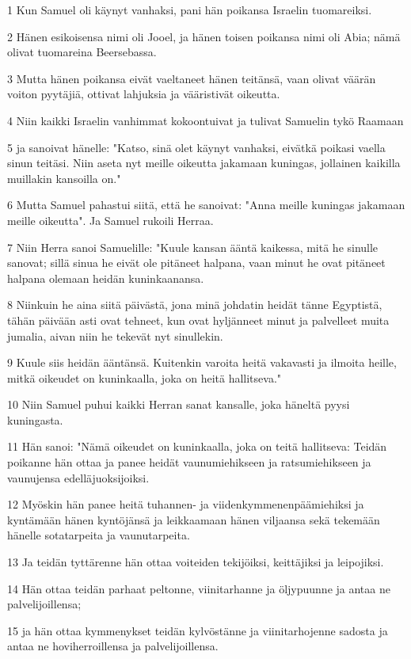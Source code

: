 \par 1 Kun Samuel oli käynyt vanhaksi, pani hän poikansa Israelin tuomareiksi.
\par 2 Hänen esikoisensa nimi oli Jooel, ja hänen toisen poikansa nimi oli Abia; nämä olivat tuomareina Beersebassa.
\par 3 Mutta hänen poikansa eivät vaeltaneet hänen teitänsä, vaan olivat väärän voiton pyytäjiä, ottivat lahjuksia ja vääristivät oikeutta.
\par 4 Niin kaikki Israelin vanhimmat kokoontuivat ja tulivat Samuelin tykö Raamaan
\par 5 ja sanoivat hänelle: "Katso, sinä olet käynyt vanhaksi, eivätkä poikasi vaella sinun teitäsi. Niin aseta nyt meille oikeutta jakamaan kuningas, jollainen kaikilla muillakin kansoilla on."
\par 6 Mutta Samuel pahastui siitä, että he sanoivat: "Anna meille kuningas jakamaan meille oikeutta". Ja Samuel rukoili Herraa.
\par 7 Niin Herra sanoi Samuelille: "Kuule kansan ääntä kaikessa, mitä he sinulle sanovat; sillä sinua he eivät ole pitäneet halpana, vaan minut he ovat pitäneet halpana olemaan heidän kuninkaanansa.
\par 8 Niinkuin he aina siitä päivästä, jona minä johdatin heidät tänne Egyptistä, tähän päivään asti ovat tehneet, kun ovat hyljänneet minut ja palvelleet muita jumalia, aivan niin he tekevät nyt sinullekin.
\par 9 Kuule siis heidän ääntänsä. Kuitenkin varoita heitä vakavasti ja ilmoita heille, mitkä oikeudet on kuninkaalla, joka on heitä hallitseva."
\par 10 Niin Samuel puhui kaikki Herran sanat kansalle, joka häneltä pyysi kuningasta.
\par 11 Hän sanoi: "Nämä oikeudet on kuninkaalla, joka on teitä hallitseva: Teidän poikanne hän ottaa ja panee heidät vaunumiehikseen ja ratsumiehikseen ja vaunujensa edelläjuoksijoiksi.
\par 12 Myöskin hän panee heitä tuhannen- ja viidenkymmenenpäämiehiksi ja kyntämään hänen kyntöjänsä ja leikkaamaan hänen viljaansa sekä tekemään hänelle sotatarpeita ja vaunutarpeita.
\par 13 Ja teidän tyttärenne hän ottaa voiteiden tekijöiksi, keittäjiksi ja leipojiksi.
\par 14 Hän ottaa teidän parhaat peltonne, viinitarhanne ja öljypuunne ja antaa ne palvelijoillensa;
\par 15 ja hän ottaa kymmenykset teidän kylvöstänne ja viinitarhojenne sadosta ja antaa ne hoviherroillensa ja palvelijoillensa.
